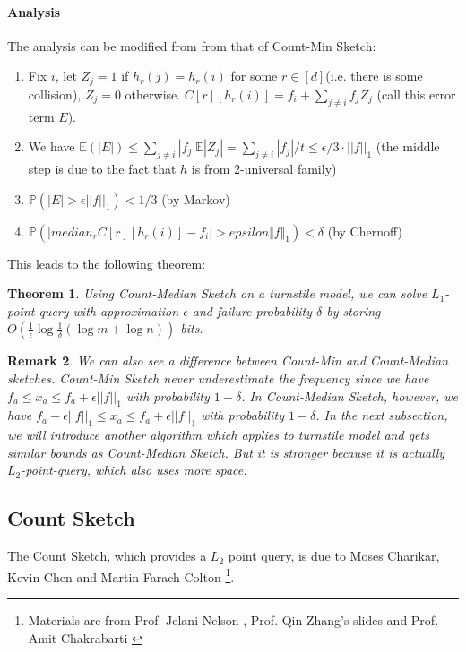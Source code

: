 \documentclass[11pt]{article}
\theoremstyle{plain}
\newtheorem{theorem}{Theorem}[section]
\newtheorem{remark}[theorem]{Remark}
\begin{document}
\paragraph{Analysis}The analysis can be modified from from that of 
Count-Min Sketch: 
\begin{enumerate} 
	\item Fix $i$, let $Z_j = 1$ if $h_r(j)=h_r(i)$ for some $r\in 
	[d]$(i.e. there is some collision), $Z_j=0$ otherwise. $C[r][h_r(i)]=f_i + 
	\sum_{j\neq i} f_jZ_j$ (call this error term $E$). 
	\item We have $\mathbb{E}(|E|)\leq\sum_{j\neq 
	i}|f_j|\mathbb{E}|Z_j|=\sum_{j\neq 
		i}|f_j|/t\leq\epsilon/3\cdot||f||_1$ (the middle step is due to the fact that 
	$h$ is from 2-universal family)
	\item $\mathbb{P}(|E|>\epsilon||f||_1)< 1/3$ (by Markov)
	\item $\mathbb{P}(|median_r C[r][h_r(i)]-f_i|>epsilon\Vert 
	f\Vert_1)<\delta$ (by Chernoff)
\end{enumerate}
This leads to the following theorem:

\begin{theorem}
	Using Count-Median Sketch on a turnstile model, we can solve 
	$L_1$-point-query with approximation 
	$\epsilon$ and failure probability $\delta$ by storing $O(\frac{1}{\epsilon}\log 
	\frac{1}{\delta}(\log m 
	+\log n))$ bits.
\end{theorem}

\begin{remark}
We can also see a difference between Count-Min and Count-Median sketches. 
Count-Min Sketch never underestimate the frequency since we have $f_a\leq x_a 
\leq f_a+	\epsilon||f||_1$ with probability $1-\delta$. In Count-Median Sketch, 
however, we have $f_a-\epsilon||f||_1 \leq x_a 
\leq f_a+	\epsilon||f||_1$ with probability $1-\delta$. In the next subsection, we 
will introduce another algorithm which applies to turnstile model and gets 
similar bounds as Count-Median Sketch. But it is stronger because it is actually 
$L_2$-point-query, which also uses more space. 

\end{remark}


\subsection{Count Sketch}
The Count Sketch, which provides a $L_2$ point query, is due to	Moses 
Charikar, Kevin Chen and Martin Farach-Colton	
 \cite{Charikar02}\footnote{Materials are from 
		Prof. Jelani Nelson  \cite{Nel2015-web}, Prof. Qin Zhang's 
		slides  \cite{zhang2017-slides} and Prof. Amit 
		Chakrabarti  \cite{Cha2015-notes}}. 
	
\end{document}
